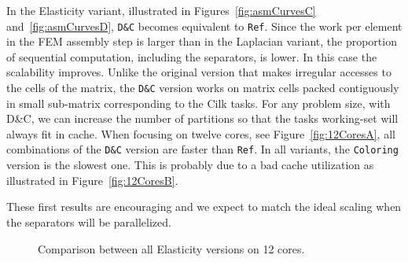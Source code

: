 \documentclass[10pt]{IOS-Book-Article}
\begin{document}
In the Elasticity variant, illustrated in Figures~\ref{fig:asmCurvesC} and~\ref{fig:asmCurvesD}, {\tt D\&C} becomes equivalent to {\tt Ref}.
Since the work per element in the FEM assembly step is larger than in the Laplacian variant, the proportion of sequential computation, including the separators, is lower.
In this case the scalability improves.
Unlike the original version that makes irregular accesses to the cells of the matrix, the {\tt D\&C} version works on matrix cells packed contiguously in small sub-matrix corresponding to the Cilk tasks.
For any problem size, with D\&C, we can increase the number of partitions so that the tasks working-set will always fit in cache.
When focusing on twelve cores, see Figure~\ref{fig:12CoresA}, all combinations of the {\tt D\&C} version are faster than {\tt Ref}.
In all variants, the {\tt Coloring} version is the slowest one.
This is probably due to a bad cache utilization as illustrated in Figure~\ref{fig:12CoresB}.

These first results are encouraging and we expect to match the ideal scaling when the separators will be parallelized.

\begin{figure}[t]
 \caption{Comparison between all Elasticity versions on 12 cores.}
 \label{fig:12Cores}
\end{figure}
\end{document}
